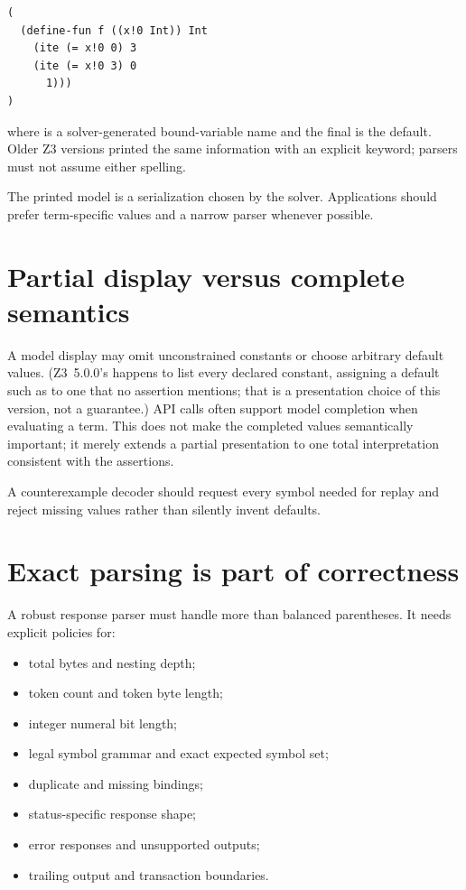 \documentclass[10pt,letterpaper,oneside]{report}
\newcommand{\code}[1]{\texttt{\detokenize{#1}}}
\begin{document}
\begin{lstlisting}[language=SMTLib]
(
  (define-fun f ((x!0 Int)) Int
    (ite (= x!0 0) 3
    (ite (= x!0 3) 0
      1)))
)
\end{lstlisting}

where \code{x!0} is a solver-generated bound-variable name and the final \code{1} is the default. Older Z3 versions printed the same information with an explicit \code{else} keyword; parsers must not assume either spelling.


The printed model is a serialization chosen by the solver. Applications should prefer term-specific values and a narrow parser whenever possible.

\section{Partial display versus complete semantics}

A model display may omit unconstrained constants or choose arbitrary default values. (Z3~5.0.0's \code{get-model} happens to list every declared constant, assigning a default such as \code{0} to one that no assertion mentions; that is a presentation choice of this version, not a guarantee.) API calls often support model completion when evaluating a term. This does not make the completed values semantically important; it merely extends a partial presentation to one total interpretation consistent with the assertions.

A counterexample decoder should request every symbol needed for replay and reject missing values rather than silently invent defaults.

\section{Exact parsing is part of correctness}

A robust response parser must handle more than balanced parentheses. It needs explicit policies for:

\begin{itemize}
\item total bytes and nesting depth;
\item token count and token byte length;
\item integer numeral bit length;
\item legal symbol grammar and exact expected symbol set;
\item duplicate and missing bindings;
\item status-specific response shape;
\item error responses and unsupported outputs;
\item trailing output and transaction boundaries.
\end{itemize}
\end{document}
